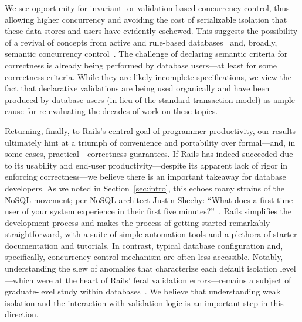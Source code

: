 We see opportunity for invariant- or validation-based concurrency
control, thus allowing higher concurrency and avoiding the cost of
serializable isolation that these data stores and users have evidently
eschewed. This suggests the possibility of a revival of concepts from
active and rule-based databases~\cite{activedb-book} and, broadly,
semantic concurrency control~\cite{tamer-book}. The challenge of
declaring semantic criteria for correctness is already being performed
by database users---at least for some correctness criteria. While they
are likely incomplete specifications, we view the fact that
declarative validations are being used organically and have been
produced by database users (in lieu of the standard transaction model) as
ample cause for re-evaluating the decades of work on these topics.

 Returning, finally, to Rails's central
goal of programmer productivity, our results ultimately hint at a
triumph of convenience and portability over formal---and, in some
cases, practical---correctness guarantees. If Rails has indeed
succeeded due to its usability and end-user productivity---despite its
apparent lack of rigor in enforcing correctness---we believe there is
an important takeaway for database developers. As we noted in
Section~\ref{sec:intro}, this echoes many strains of the NoSQL
movement; per NoSQL architect Justin Sheehy: ``What does a first-time
user of your system experience in their first five
minutes?''~\cite{marcus-talk}. Rails simplifies the development
process and makes the process of getting started remarkably
straightforward, with a suite of simple automation tools and a
plethora of starter documentation and tutorials. In contrast, typical
database configuration and, specifically, concurrency control
mechanism are often less accessible. Notably, understanding the slew
of anomalies that characterize each default isolation level---which
were at the heart of Rails' feral validation errors---remains a
subject of graduate-level study within
databases~\cite{adya-isolation,hat-vldb}. We believe that
understanding weak isolation and the interaction with validation logic
is an important step in this direction.




